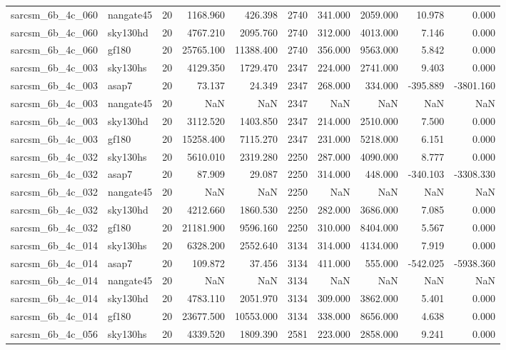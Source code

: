 \documentclass{article}
\begin{document}
\begin{longtable}{llrrrrrrrr}
sarcsm\_6b\_4c\_060 & nangate45 & 20 & 1168.960 & 426.398 & 2740 & 341.000 & 2059.000 & 10.978 & 0.000 \\
sarcsm\_6b\_4c\_060 & sky130hd & 20 & 4767.210 & 2095.760 & 2740 & 312.000 & 4013.000 & 7.146 & 0.000 \\
sarcsm\_6b\_4c\_060 & gf180 & 20 & 25765.100 & 11388.400 & 2740 & 356.000 & 9563.000 & 5.842 & 0.000 \\
sarcsm\_6b\_4c\_003 & sky130hs & 20 & 4129.350 & 1729.470 & 2347 & 224.000 & 2741.000 & 9.403 & 0.000 \\
sarcsm\_6b\_4c\_003 & asap7 & 20 & 73.137 & 24.349 & 2347 & 268.000 & 334.000 & -395.889 & -3801.160 \\
sarcsm\_6b\_4c\_003 & nangate45 & 20 & NaN & NaN & 2347 & NaN & NaN & NaN & NaN \\
sarcsm\_6b\_4c\_003 & sky130hd & 20 & 3112.520 & 1403.850 & 2347 & 214.000 & 2510.000 & 7.500 & 0.000 \\
sarcsm\_6b\_4c\_003 & gf180 & 20 & 15258.400 & 7115.270 & 2347 & 231.000 & 5218.000 & 6.151 & 0.000 \\
sarcsm\_6b\_4c\_032 & sky130hs & 20 & 5610.010 & 2319.280 & 2250 & 287.000 & 4090.000 & 8.777 & 0.000 \\
sarcsm\_6b\_4c\_032 & asap7 & 20 & 87.909 & 29.087 & 2250 & 314.000 & 448.000 & -340.103 & -3308.330 \\
sarcsm\_6b\_4c\_032 & nangate45 & 20 & NaN & NaN & 2250 & NaN & NaN & NaN & NaN \\
sarcsm\_6b\_4c\_032 & sky130hd & 20 & 4212.660 & 1860.530 & 2250 & 282.000 & 3686.000 & 7.085 & 0.000 \\
sarcsm\_6b\_4c\_032 & gf180 & 20 & 21181.900 & 9596.160 & 2250 & 310.000 & 8404.000 & 5.567 & 0.000 \\
sarcsm\_6b\_4c\_014 & sky130hs & 20 & 6328.200 & 2552.640 & 3134 & 314.000 & 4134.000 & 7.919 & 0.000 \\
sarcsm\_6b\_4c\_014 & asap7 & 20 & 109.872 & 37.456 & 3134 & 411.000 & 555.000 & -542.025 & -5938.360 \\
sarcsm\_6b\_4c\_014 & nangate45 & 20 & NaN & NaN & 3134 & NaN & NaN & NaN & NaN \\
sarcsm\_6b\_4c\_014 & sky130hd & 20 & 4783.110 & 2051.970 & 3134 & 309.000 & 3862.000 & 5.401 & 0.000 \\
sarcsm\_6b\_4c\_014 & gf180 & 20 & 23677.500 & 10553.000 & 3134 & 338.000 & 8656.000 & 4.638 & 0.000 \\
sarcsm\_6b\_4c\_056 & sky130hs & 20 & 4339.520 & 1809.390 & 2581 & 223.000 & 2858.000 & 9.241 & 0.000 \\

\end{longtable}
\end{document}
